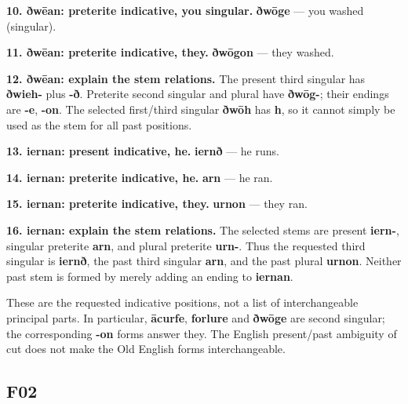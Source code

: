 \textbf{10. ðwēan: preterite indicative, you singular.} \textbf{ðwōge} — you washed (singular).

\textbf{11. ðwēan: preterite indicative, they.} \textbf{ðwōgon} — they washed.

\textbf{12. ðwēan: explain the stem relations.} The present third singular has \textbf{ðwieh-} plus \textbf{-ð}. Preterite second singular and plural have \textbf{ðwōg-}; their endings are \textbf{-e}, \textbf{-on}. The selected first/\allowbreak{}third singular \textbf{ðwōh} has \textbf{h}, so it cannot simply be used as the stem for all past positions.

\textbf{13. iernan: present indicative, he.} \textbf{iernð} — he runs.

\textbf{14. iernan: preterite indicative, he.} \textbf{arn} — he ran.

\textbf{15. iernan: preterite indicative, they.} \textbf{urnon} — they ran.

\textbf{16. iernan: explain the stem relations.} The selected stems are present \textbf{iern-}, singular preterite \textbf{arn}, and plural preterite \textbf{urn-}. Thus the requested third singular is \textbf{iernð}, the past third singular \textbf{arn}, and the past plural \textbf{urnon}. Neither past stem is formed by merely adding an ending to \textbf{iernan}.

These are the requested indicative positions, not a list of interchangeable principal parts. In particular, \textbf{ācurfe}, \textbf{forlure} and \textbf{ðwōge} are second singular; the corresponding \textbf{-on} forms answer they. The English present/\allowbreak{}past ambiguity of cut does not make the Old English forms interchangeable.

\subsection*{F02}

